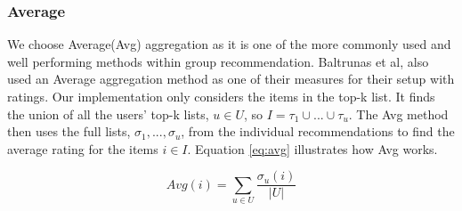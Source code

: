 \subsubsection{Average}\label{sec:average}
We choose Average(Avg) aggregation as it is one of the more commonly used and well performing methods within group recommendation\cite{recbook:average}. Baltrunas et al, also used an Average aggregation method as one of their measures for their setup with ratings\cite{Baltrunas:2010:GRR:1864708.1864733}. Our implementation only considers the items in the top-k list. It finds the union of all the users' top-k lists, $u \in U$, so $I = \tau_1 \cup ... \cup \tau_u$. The Avg method then uses the full lists, $\sigma_1, ..., \sigma_u$, from the individual recommendations to find the average rating for the items $i \in I$. Equation \ref{eq:avg} illustrates how Avg works.

\begin{equation}\label{eq:avg}
Avg(i) = \sum_{u \in U}\frac{\sigma_u(i)}{|U|} 
\end{equation}